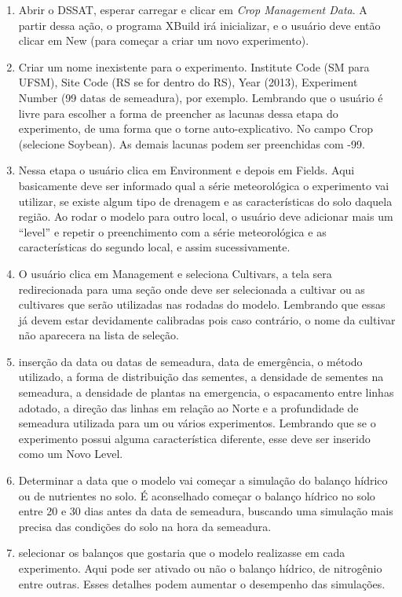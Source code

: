 \documentclass[12pt]{article}
\begin{document}
	\begin{enumerate}
		\item  Abrir o DSSAT, esperar carregar e clicar em \emph{Crop Management Data}. A partir dessa ação, o programa XBuild irá inicializar, e o usuário deve então clicar em New (para começar a criar um novo experimento).
		\item  Criar um nome inexistente para o experimento. Institute Code (SM para UFSM), Site Code (RS se for dentro do RS), Year (2013), Experiment Number (99 datas de semeadura), por exemplo. Lembrando que o usuário é livre para escolher a forma de preencher as lacunas dessa etapa do experimento, de uma forma que o torne auto-explicativo. No campo Crop (selecione Soybean). As demais lacunas podem ser preenchidas com -99.
		\item Nessa etapa o usuário clica em Environment e depois em Fields. Aqui basicamente deve ser informado qual a série meteorológica o experimento vai utilizar, se existe algum tipo de drenagem e as características do solo daquela região. Ao rodar o modelo para outro local, o usuário deve adicionar mais um “level” e repetir o preenchimento com a série meteorológica e as características do segundo local, e assim sucessivamente.  
		\item O usuário clica em Management e seleciona Cultivars, a tela sera redirecionada para uma seção onde deve ser selecionada a cultivar ou as cultivares que serão utilizadas nas rodadas do modelo. Lembrando que essas já devem estar devidamente calibradas pois caso contrário, o nome da cultivar não aparecera na lista de seleção.
		\item inserção da data ou datas de semeadura, data de emergência, o método utilizado, a forma de distribuição das sementes, a densidade de sementes na semeadura, a densidade de plantas na emergencia, o espacamento entre linhas adotado, a direção das linhas em relação ao Norte e a profundidade de semeadura utilizada para um ou vários experimentos. Lembrando que se o experimento possui alguma característica diferente, esse deve ser inserido como um Novo Level.
		\item Determinar a data que o modelo vai começar a simulação do balanço hídrico ou de nutrientes no solo. É aconselhado começar o balanço hídrico no solo entre 20 e 30 dias antes da data de semeadura, buscando uma simulação mais precisa das condições do solo na hora da semeadura.
		\item selecionar os balanços que gostaria que o modelo realizasse em cada experimento. Aqui pode ser ativado ou não o balanço hídrico, de nitrogênio entre outras. Esses detalhes podem aumentar o desempenho das simulações.

\end{enumerate}
\end{document}
